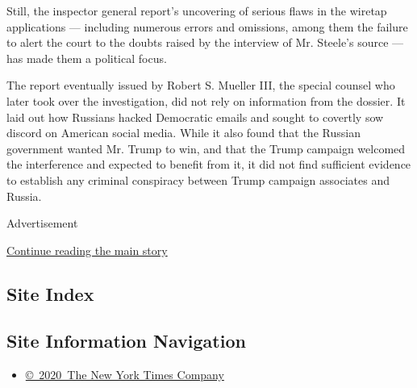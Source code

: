 Still, the inspector general report's uncovering of serious flaws in the
wiretap applications --- including numerous errors and omissions, among
them the failure to alert the court to the doubts raised by the
interview of Mr. Steele's source --- has made them a political focus.

The report eventually issued by Robert S. Mueller III, the special
counsel who later took over the investigation, did not rely on
information from the dossier. It laid out how Russians hacked Democratic
emails and sought to covertly sow discord on American social media.
While it also found that the Russian government wanted Mr. Trump to win,
and that the Trump campaign welcomed the interference and expected to
benefit from it, it did not find sufficient evidence to establish any
criminal conspiracy between Trump campaign associates and Russia.

Advertisement

\protect\hyperlink{after-bottom}{Continue reading the main story}

\hypertarget{site-index}{%
\subsection{Site Index}\label{site-index}}

\hypertarget{site-information-navigation}{%
\subsection{Site Information
Navigation}\label{site-information-navigation}}

\begin{itemize}
\tightlist
\item
  \href{https://help.nytimes.com/hc/en-us/articles/115014792127-Copyright-notice}{©~2020~The
  New York Times Company}
\end{itemize}

